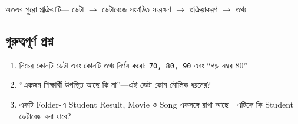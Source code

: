 অতএব পুরো প্রক্রিয়াটি--- ডেটা \(\rightarrow\) ডেটাবেজে সংগঠিত সংরক্ষণ \(\rightarrow\) প্রক্রিয়াকরণ \(\rightarrow\) তথ্য।

\subsection{গুরুত্বপূর্ণ প্রশ্ন}


\begin{enumerate}

    \item নিচের কোনটি ডেটা এবং কোনটি তথ্য নির্ণয় করো:
    \texttt{70, 80, 90} এবং ``গড় নম্বর 80''।

    \item ``একজন শিক্ষার্থী উপস্থিত আছে কি না''---এই ডেটা কোন
    মৌলিক ধরনের?

    \item একটি Folder-এ Student Result, Movie ও Song একসঙ্গে
    রাখা আছে। এটিকে কি Student ডেটাবেজ বলা যাবে?

    \end{enumerate}


